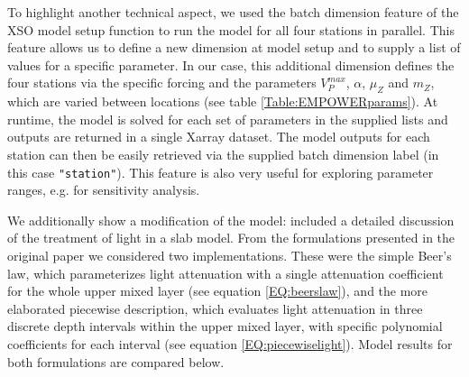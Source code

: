 \documentclass[journal abbreviation, manuscript]{copernicus}
\begin{document}
To highlight another technical aspect, we used the batch dimension feature of the XSO model setup function to run the model for all four stations in parallel. This feature allows us to define a new dimension at model setup and to supply a list of values for a specific parameter. In our case, this additional dimension defines the four stations via the specific forcing and the parameters $V_P^{max}$, $\alpha$, $\mu_Z$ and $m_Z$, which are varied between locations (see table \ref{Table:EMPOWERparams}). At runtime, the model is solved for each set of parameters in the supplied lists and outputs are returned in a single Xarray dataset. The model outputs for each station can then be easily retrieved via the supplied batch dimension label (in this case \texttt{"station"}). This feature is also very useful for exploring parameter ranges, e.g. for sensitivity analysis.

We additionally show a modification of the model: \citet{Anderson2015c} included a detailed discussion of the treatment of light in a slab model. From the formulations presented in the original paper we considered two implementations. These were the simple Beer's law, which parameterizes light attenuation with a single attenuation coefficient for the whole upper mixed layer (see equation \ref{EQ:beerslaw}), and the more elaborated piecewise description, which evaluates light attenuation in three discrete depth intervals within the upper mixed layer, with specific polynomial coefficients for each interval (see equation \ref{EQ:piecewiselight}). Model results for both formulations are compared below.
\end{document}
